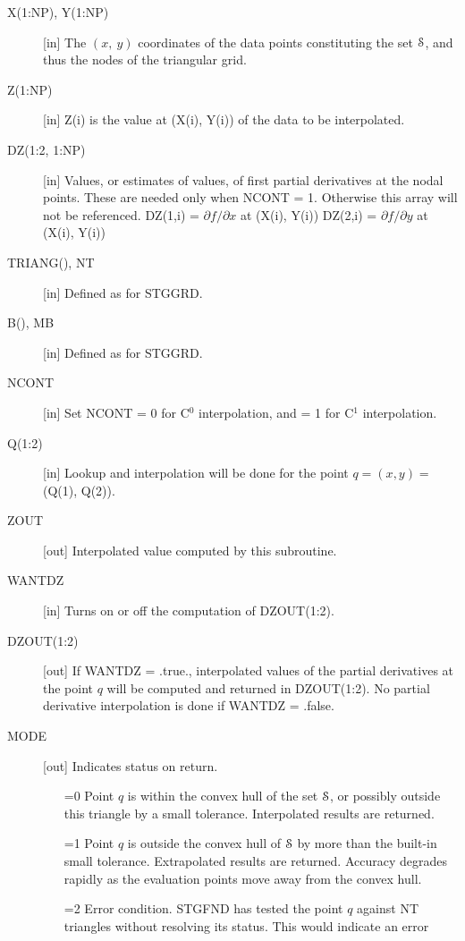 \documentclass[twoside]{MATH77}
\begin{document}
\begin{description}
\item[X(1:NP), Y(1:NP)] [in] The $(x,\ y)$ coordinates of the data points
constituting the set {$\EuScript S$}, and thus the nodes of the triangular
grid.
\item[Z(1:NP)] [in] Z(i) is the value at (X(i), Y(i)) of the data to
be interpolated.
\item[DZ(1:2, 1:NP)] [in] Values, or estimates of values, of first
partial derivatives at the nodal points.  These are needed only when
NCONT = 1.  Otherwise this array will not be referenced.
\newline
\hspace{.25in} DZ(1,i) = $\partial f / \partial x$ at (X(i), Y(i))
\newline
\hspace{.25in} DZ(2,i) = $\partial f / \partial y$ at (X(i), Y(i))
\item[TRIANG(), NT] [in] Defined as for STGGRD.
\item[B(), MB] [in] Defined as for STGGRD.
\item[NCONT] [in] Set NCONT = 0 for C$^0$ interpolation,
and = 1 for C$^1$ interpolation.
\item[Q(1:2)] [in] Lookup and interpolation will be done for the point
$q = (x, y) =$ (Q(1), Q(2)).
\item[ZOUT] [out] Interpolated value computed by this subroutine.
\item[WANTDZ] [in] Turns on or off the computation of DZOUT(1:2).
\item[DZOUT(1:2)] [out] If WANTDZ = .true., interpolated values of the
partial derivatives at the point $q$ will be computed and returned in
DZOUT(1:2).  No partial derivative interpolation is done if WANTDZ = .false.
\item[MODE] [out] Indicates status on return.
\begin{itemize}
\item[=0] Point $q$ is within the convex hull of the set {$\EuScript S$}, or possibly
outside this triangle by a small tolerance.  Interpolated results are
returned.
\item[=1] Point $q$ is outside the convex hull of {$\EuScript S$} by more
than the built-in small tolerance.  Extrapolated results are returned.
Accuracy degrades rapidly as the evaluation points move away from the
convex hull.
\item[=2] Error condition.  STGFND has tested the point $q$
against
NT triangles without resolving its status.  This would indicate an error

\end{itemize}
\end{description}
\end{document}
